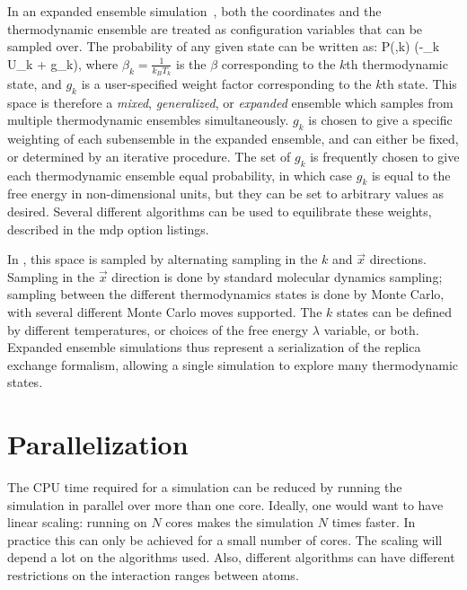 In an expanded ensemble simulation~\cite{Lyubartsev1992}, both the coordinates and the
thermodynamic ensemble are treated as configuration variables that can
be sampled over.  The probability of any given state can be written as:
\beq
P(,k) \propto \exp\left(-\beta_k U_k + g_k\right),
\eeq
where $\beta_k = \frac{1}{k_B T_k}$ is the $\beta$ corresponding to the $k$th
thermodynamic state, and $g_k$ is a user-specified weight factor corresponding
to the $k$th state.  This space is therefore a {\em mixed}, {\em generalized}, or {\em
  expanded} ensemble which samples from multiple thermodynamic
ensembles simultaneously. $g_k$ is chosen to give a specific weighting
of each subensemble in the expanded ensemble, and can either be fixed,
or determined by an iterative procedure. The set of $g_k$ is
frequently chosen to give each thermodynamic ensemble equal
probability, in which case $g_k$ is equal to the free energy in
non-dimensional units, but they can be set to arbitrary values as
desired.  Several different algorithms can be used to equilibrate
these weights, described in the mdp option listings.

In {\gromacs}, this space is sampled by alternating sampling in the $k$
and $\vec{x}$ directions.  Sampling in the $\vec{x}$ direction is done
by standard molecular dynamics sampling; sampling between the
different thermodynamics states is done by Monte Carlo, with several
different Monte Carlo moves supported. The $k$ states can be defined
by different temperatures, or choices of the free energy $\lambda$
variable, or both.  Expanded ensemble simulations thus represent a
serialization of the replica exchange formalism, allowing a single
simulation to explore many thermodynamic states.



\section{Parallelization}
The CPU time required for a simulation can be reduced by running the simulation
in parallel over more than one core.
Ideally, one would want to have linear scaling: running on $N$ cores
makes the simulation $N$ times faster. In practice this can only be
achieved for a small number of cores. The scaling will depend
a lot on the algorithms used. Also, different algorithms can have different
restrictions on the interaction ranges between atoms.

